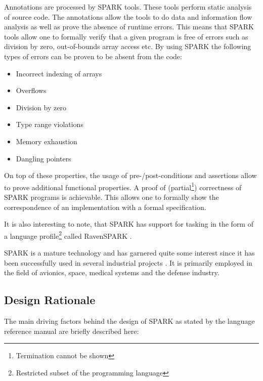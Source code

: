Annotations are processed by SPARK tools. These tools perform static analysis
of source code. The annotations allow the tools to do data and information flow
analysis as well as prove the absence of runtime errors.
This means that SPARK tools allow one to formally verify that a given program
is free of errors such as division by zero, out-of-bounds array access etc. By
using SPARK the following types of errors can be proven to be absent from the
code:

\begin{itemize}
	\item Incorrect indexing of arrays
	\item Overflows
	\item Division by zero
	\item Type range violations
	\item Memory exhaustion
	\item Dangling pointers
\end{itemize}

On top of these properties, the usage of pre-/post-conditions and assertions
allow to prove additional functional properties. A proof of
(partial\footnote{Termination cannot be shown}) correctness of SPARK programs is
achievable. This allows one to formally show the correspondence of an
implementation with a formal specification.

It is also interesting to note, that SPARK has support for tasking in the form
of a language profile\footnote{Restricted subset of the programming language}
called RavenSPARK \cite{RavenSPARK}.

SPARK is a mature technology and has garnered quite some interest since it has
been successfully used in several industrial projects
\cite{Chapman:2000:IES:369264.369270}. It is primarily employed in the field of
avionics, space, medical systems and the defense industry.

\subsection{Design Rationale}
The main driving factors behind the design of SPARK as stated by the language
reference manual \cite{SPARK} are briefly described here:

